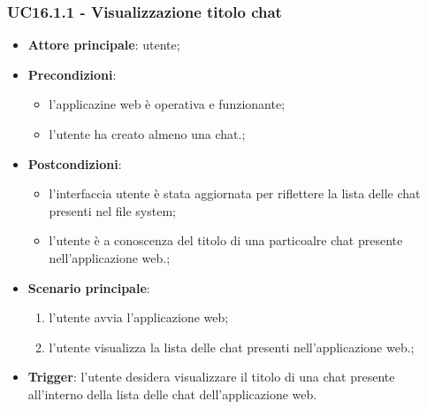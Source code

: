 \documentclass[10pt, a4paper]{article}
\begin{document}
    \subsubsection{UC16.1.1 - Visualizzazione titolo chat}
    \begin{itemize}
        \item \textbf{Attore principale}: utente;
        \item \textbf{Precondizioni}: 
        \begin{itemize}
            \item l'applicazine web è operativa e funzionante;
            \item l'utente ha creato almeno una chat.;
        \end{itemize}
        \item \textbf{Postcondizioni}: 
        \begin{itemize}
            \item l'interfaccia utente è stata aggiornata per riflettere la lista delle chat presenti nel file system;
            \item l'utente è a conoscenza del titolo di una particoalre chat presente nell'applicazione web.;
        \end{itemize}
        \item \textbf{Scenario principale}:
            \begin{enumerate}
                \item l'utente avvia l'applicazione web;
                \item l'utente visualizza la lista delle chat presenti nell'applicazione web.;
            \end{enumerate}
        \item \textbf{Trigger}: l'utente desidera visualizzare il titolo di una chat presente all'interno della lista delle chat dell'applicazione web.
    \end{itemize}
\end{document}
